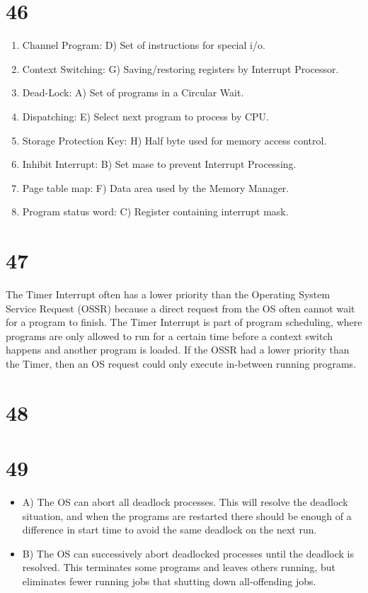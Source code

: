 \documentclass[a4paper,11pt]{article}
\begin{document}
\section*{46}
\begin{enumerate}
  \item Channel Program: D) Set of instructions for special i/o.
  \item Context Switching: G) Saving/restoring registers by Interrupt Processor.
  \item Dead-Lock:  A) Set of programs in a Circular Wait.
  \item Dispatching:  E) Select next program to process by CPU.
  \item Storage Protection Key:  H) Half byte used for memory access control.
  \item Inhibit Interrupt:  B) Set mase to prevent Interrupt Processing.
  \item Page table map:  F) Data area used by the Memory Manager.
  \item Program status word:  C) Register containing interrupt mask.
\end{enumerate}



\section*{47}
The Timer Interrupt often has a lower priority than the Operating System Service Request (OSSR) because a direct request from the OS often cannot wait for a program to finish.  The Timer Interrupt is part of program scheduling, where programs are only allowed to run for a certain time before a context switch happens and another program is loaded.  If the OSSR had a lower priority than the Timer, then an OS request could only execute in-between running programs.  



\section*{48}


\section*{49}
\begin{itemize}
  \item A) The OS can abort all deadlock processes.  This will resolve the deadlock situation, and when the programs are restarted there should be enough of a difference in start time to avoid the same deadlock on the next run.  
  \item B) The OS can successively abort deadlocked processes until the deadlock is resolved.  This terminates some programs and leaves others running, but eliminates fewer running jobs that shutting down all-offending jobs.  
\end{itemize}
\end{document}
